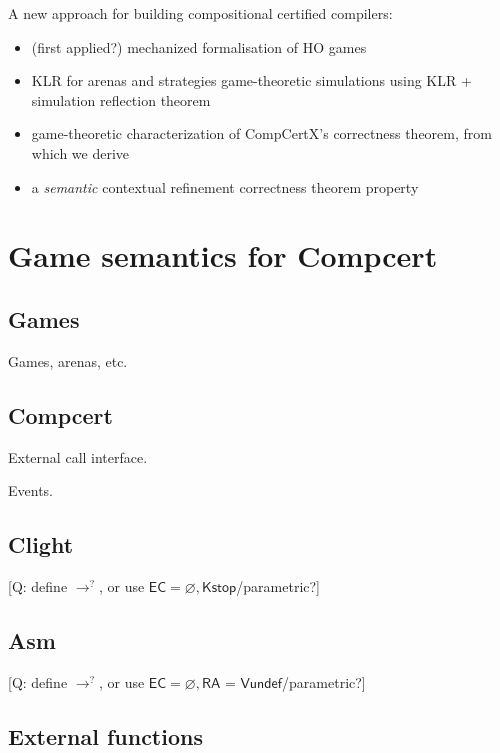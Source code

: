 \documentclass[acmsmall,anonymous,review]{acmart}
\begin{document}
A new approach for building compositional certified compilers:
\begin{itemize}
\item (first applied?) mechanized formalisation of HO games
\item KLR for arenas and strategies game-theoretic simulations using KLR + simulation reflection theorem
\item game-theoretic characterization of CompCertX's correctness theorem, from which we derive
\item a \emph{semantic} contextual refinement correctness theorem property
\end{itemize}


\section{Game semantics for Compcert} %

\subsection{Games} %

Games, arenas, etc.


\subsection{Compcert} %

External call interface.

Events.


\subsection{Clight} %

[Q: define $\rightarrow^?$,
or use $\textsf{EC} = \varnothing, \textsf{Kstop}$/parametric?]


\subsection{Asm} %

[Q: define $\rightarrow^?$,
or use $\textsf{EC} = \varnothing, \textsf{RA = Vundef}$/parametric?]


\subsection{External functions} %
\end{document}
